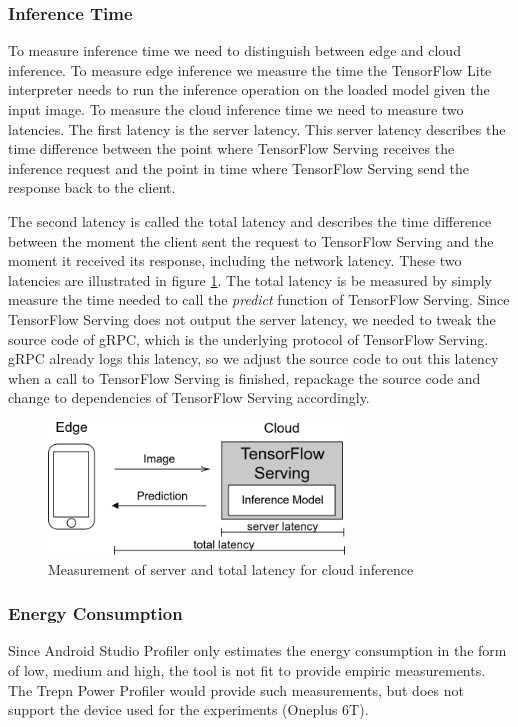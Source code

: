 \subsubsection{Inference Time}
To measure inference time we need to  distinguish between edge and cloud inference. To measure edge inference we measure the time the TensorFlow Lite interpreter needs to run the inference operation on the loaded model given the input image.
To measure the cloud inference time we need to measure two latencies. The first latency is the server latency. This server latency describes the time difference between the point where TensorFlow Serving receives the inference request and the point in time where TensorFlow Serving send the response back to the client.



The second latency is called the total latency and describes the time difference between the moment the client sent the request to TensorFlow Serving and the moment it received its response, including the network latency.
These two latencies are illustrated in figure \ref{fig:serverLat}.
The total latency is be measured by simply measure the time needed to call the \emph{predict} function of TensorFlow Serving.
Since TensorFlow Serving does not output the server latency, we needed to tweak the source code of gRPC, which is the underlying protocol of TensorFlow Serving. gRPC already logs this latency, so we adjust the source code to out this latency when a call to TensorFlow Serving is finished, repackage the source code and change to dependencies of TensorFlow Serving accordingly.
\begin{figure}[H]
\centering
\includegraphics[width=0.7\textwidth]{./Bilder/server_latency.png}
\caption{Measurement of server and total latency for cloud inference}
\label{fig:serverLat}
\end{figure}
\subsubsection{Energy Consumption}
Since Android Studio Profiler only estimates the energy consumption in the form of low, medium and high, the tool is not fit to provide empiric measurements. The Trepn Power Profiler would provide such measurements, but does not support the device used for the experiments (Oneplus 6T).
